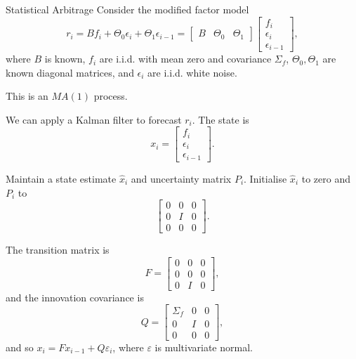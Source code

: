 \documentclass{beamer}
\begin{document}
\begin{frame}{Statistical Arbitrage}
	Consider the modified factor model
	$$r_i = Bf_i + \Theta_0\epsilon_i + \Theta_1\epsilon_{i-1} = \left[\begin{matrix}B & \Theta_0 & \Theta_1\end{matrix}\right]\left[\begin{matrix}f_i \\ \epsilon_i \\ \epsilon_{i-1}\end{matrix}\right],$$
	where $B$ is known, $f_i$ are i.i.d. with mean zero and covariance $\Sigma_f$, $\Theta_0,\Theta_1$ are known diagonal matrices, and $\epsilon_i$ are i.i.d. white noise.

	This is an $MA(1)$ process.

	We can apply a Kalman filter to forecast $r_i$. The state is
	$$x_i = \left[\begin{matrix}f_i \\ \epsilon_i \\ \epsilon_{i-1}\end{matrix}\right].$$

	Maintain a state estimate $\hat{x}_i$ and uncertainty matrix $P_i$. Initialise $\hat{x}_i$ to zero and $P_i$ to 
	$$\left[\begin{matrix}0 & 0 & 0 \\ 0 & I & 0 \\ 0 & 0 & 0\end{matrix}\right].$$

	The transition matrix is
	$$F = \left[\begin{matrix}0 & 0 & 0 \\ 0 & 0 & 0 \\ 0 & I & 0\end{matrix}\right],$$
	and the innovation covariance is
	$$Q = \left[\begin{matrix}\Sigma_f & 0 & 0 \\ 0 & I & 0 \\ 0 & 0 & 0\end{matrix}\right],$$
	and so $x_i = Fx_{i-1} + Q\varepsilon_i$, where $\varepsilon$ is multivariate normal.


\end{frame}
\end{document}
